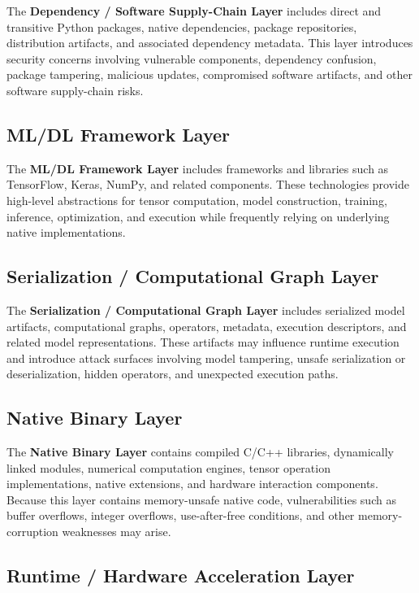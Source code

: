 \documentclass[
  12pt,
  letterpaper,
  oneside]{report}
\begin{document}
The \textbf{Dependency / Software Supply-Chain Layer} includes direct
and transitive Python packages, native dependencies, package
repositories, distribution artifacts, and associated dependency
metadata. This layer introduces security concerns involving vulnerable
components, dependency confusion, package tampering, malicious updates,
compromised software artifacts, and other software supply-chain risks.

\subsection{ML/DL Framework Layer}\label{mldl-framework-layer}

The \textbf{ML/DL Framework Layer} includes frameworks and libraries
such as TensorFlow, Keras, NumPy, and related components. These
technologies provide high-level abstractions for tensor computation,
model construction, training, inference, optimization, and execution
while frequently relying on underlying native implementations.

\subsection{Serialization / Computational Graph
Layer}\label{serialization--computational-graph-layer}

The \textbf{Serialization / Computational Graph Layer} includes
serialized model artifacts, computational graphs, operators, metadata,
execution descriptors, and related model representations. These
artifacts may influence runtime execution and introduce attack surfaces
involving model tampering, unsafe serialization or deserialization,
hidden operators, and unexpected execution paths.

\subsection{Native Binary Layer}\label{native-binary-layer}

The \textbf{Native Binary Layer} contains compiled C/C++ libraries,
dynamically linked modules, numerical computation engines, tensor
operation implementations, native extensions, and hardware interaction
components. Because this layer contains memory-unsafe native code,
vulnerabilities such as buffer overflows, integer overflows,
use-after-free conditions, and other memory-corruption weaknesses may
arise.

\subsection{Runtime / Hardware Acceleration
Layer}\label{runtime--hardware-acceleration-layer}
\end{document}

